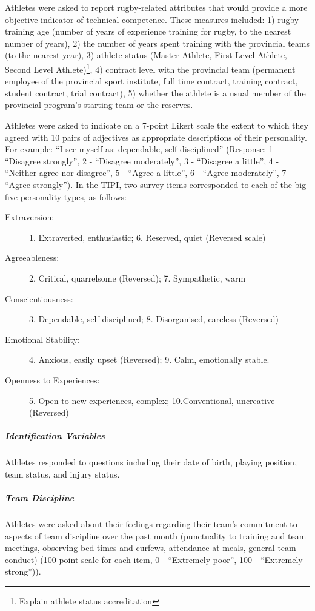Athletes were asked to report rugby-related attributes that would provide a more objective indicator of technical competence. These measures included: 1) rugby training age (number of years of experience training for rugby, to the nearest number of years), 2) the number of years spent training with the provincial teams (to the nearest year), 3) athlete status (Master Athlete, First Level Athlete, Second Level Athlete)\footnote{Explain athlete status accreditation}, 4) contract level with the provincial team (permanent employee of the provincial sport institute, full time contract, training contract, student contract, trial contract), 5) whether the athlete is a usual member of the provincial program's starting team or the reserves.


Athletes were asked to indicate on a 7-point Likert scale the extent to which they agreed with 10 pairs of adjectives as appropriate descriptions of their personality. For example: ``I see myself as: dependable, self-disciplined'' (Response: 1 - ``Disagree strongly'', 2 - ``Disagree moderately'',  3 - ``Disagree a little'', 4 - ``Neither agree nor disagree'', 5 - ``Agree a little'', 6 - ``Agree moderately'', 7 - ``Agree strongly''). In the TIPI, two survey items corresponded to each of the big-five personality types, as follows:

\begin{description}
\item [Extraversion:] 1. Extraverted, enthusiastic; 6. Reserved, quiet (Reversed scale)
\item [Agreeableness:] 2. Critical, quarrelsome (Reversed); 7. Sympathetic, warm
\item [Conscientiousness:] 3. Dependable, self-disciplined; 8. Disorganised, careless (Reversed)
\item [Emotional Stability:] 4. Anxious, easily upset (Reversed); 9. Calm, emotionally stable.
\item [Openness to Experiences:] 5. Open to new experiences, complex; 10.Conventional, uncreative (Reversed)
\end{description}


\subparagraph{Identification Variables}
Athletes responded to questions including their date of birth, playing position, team status, and injury status.

\subparagraph{Team Discipline} Athletes were asked about their feelings regarding their team's commitment to aspects of team discipline over the past month (punctuality to training and team meetings, observing bed times and curfews, attendance at meals, general team conduct) (100 point scale for each item, 0 - ``Extremely poor'', 100 - ``Extremely strong'')).





